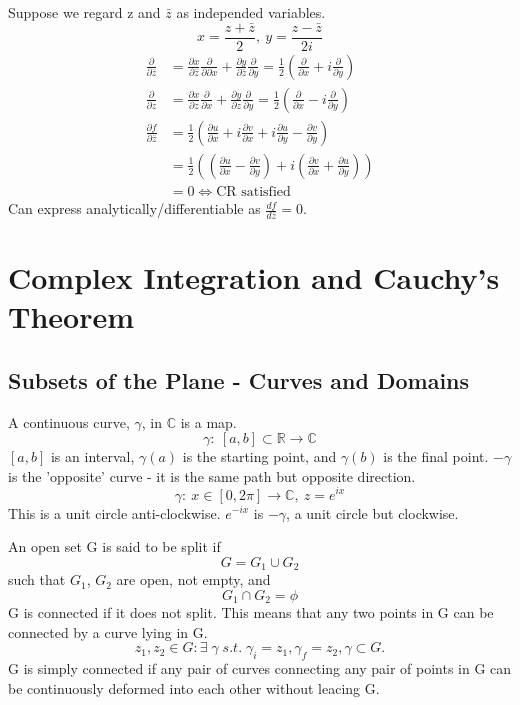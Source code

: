 \documentclass[a4paper, 11pt, normalem]{report}
\newcommand\R{\mathbb{R}}
\newcommand\C{\mathbb{C}}
\newcommand\p{\partial}
\begin{document}
Suppose we regard z and $\bar{z}$ as independed variables. 
\begin{equation}
    x = \frac{z + \bar{z}}{2},~ y = \frac{z - \bar{z}}{2i} 
\end{equation}
\begin{align}
    \frac{\p}{\p \bar{z}} &= \frac{\p x}{\p \bar{z}}\frac{\p}{\p \p x} + \frac{\p y}{\p \bar{z}}\frac{\p}{\p y} = \frac{1}{2}\left(\frac{\p}{\p x} + i\frac{\p}{\p y}\right) \\
    \frac{\p}{\p z} &= \frac{\p x}{\p z}\frac{\p}{\p x} + \frac{\p y}{\p z}\frac{\p}{\p y} = \frac{1}{2}\left(\frac{\p}{\p x} - i\frac{\p}{\p y}\right) \\
    \frac{\p f}{\p \bar{z}} &= \frac{1}{2}\left(\frac{\p u}{\p x} + i\frac{\p v}{\p x} + i\frac{\p u}{\p y} - \frac{\p v}{\p y}\right) \\
                    &= \frac{1}{2}\left(\left(\frac{\p u}{\p x} - \frac{\p v}{\p y}\right) + i\left(\frac{\p v}{\p x} + \frac{\p u}{\p y}\right) \right) \\
                    &= 0 \iff \text{CR satisfied}
\end{align}
Can express analytically/differentiable as $\frac{df}{d\bar{z}} = 0$.

\chapter{Complex Integration and Cauchy's Theorem}
\section{Subsets of the Plane - Curves and Domains}
A continuous curve, $\gamma$, in $\C$ is a map.
\begin{equation}
    \gamma:~ [a,b] \subset \R \to \C
\end{equation}
$[a,b]$ is an interval, $\gamma(a)$ is the starting point, and $\gamma(b)$ is the final point. 
$-\gamma$ is the 'opposite' curve - it is the same path but opposite direction. 
\begin{equation}
    \gamma:~ x \in [0,2\pi] \to \C,~ z = e^{ix}
\end{equation}
This is a unit circle anti-clockwise. 
$e^{-ix}$ is $-\gamma$, a unit circle but clockwise. 

An open set G is said to be split if
\begin{equation}
    G = G_1 \cup G_2
\end{equation}
such that $G_1$, $G_2$ are open, not empty, and 
\begin{equation}
    G_1 \cap G_2 = \phi
\end{equation}
G is connected if it does not split. 
This means that any two points in G can be connected by a curve lying in G. 
\begin{equation}
    z_1,z_2 \in G: \exists\; \gamma \; s.t. \; \gamma_i = z_1, \gamma_f = z_2, \gamma \subset G.
\end{equation}
G is simply connected if any pair of curves connecting any pair of points in G can be continuously deformed into each other without leacing G.
\end{document}
